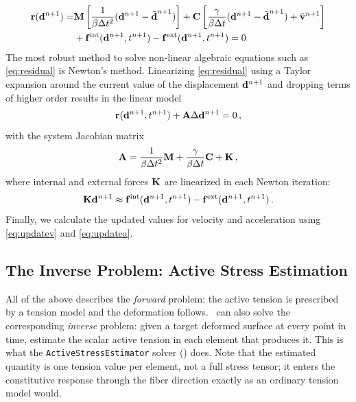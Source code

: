 \begin{align}
     \vec r(\dn{n+1}) =& \M \left[ \frac{1}{\beta \dt^2} (\dn{n+1} - \dnp{n+1}) \right]
        + \C \left[ \frac{\gamma}{\beta \dt} (\dn{n+1} - \dnp{n+1}) + \vnp{n+1} \right] \nonumber \\
        &+ \vec f^\mathrm{int}(\dn{n+1}, \tn{n+1}) - \vec f^\mathrm{ext}(\dn{n+1}, \tn{n+1}) = 0 \label{eq:residual}
\end{align}
The most robust method to solve non-linear algebraic equations such as \autoref{eq:residual} is Newton's method.
Linearizing \autoref{eq:residual} using a Taylor expansion around the current value of the displacement $\dn{n+1}$ and dropping terms of higher order results in the linear model
\begin{equation}
    \vec r(\dn{n+1}, \tn{n+1}) + \vec A \Delta \dn{n+1} = 0 \,, \label{eq:linMech}
\end{equation}
with the system Jacobian matrix
\begin{equation}
    \vec A = \frac{1}{\beta \dt^2} \M + \frac{\gamma}{\beta \dt} \C + \K \,,
\end{equation}
where internal and external forces $\K$ are linearized in each Newton iteration:
\begin{equation}
    \K \dn{n+1} \approx \vec f^\mathrm{int}(\dn{n+1}, \tn{n+1}) - \vec f^\mathrm{ext}(\dn{n+1}, \tn{n+1}) \,.
\end{equation}
Finally, we calculate the updated values for velocity and acceleration using \autoref{eq:updatev} and \autoref{eq:updatea}.


\subsection{The Inverse Problem: Active Stress Estimation}
\label{model:inverseproblem}

All of the above describes the \emph{forward} problem: the active tension is prescribed by a tension model and the deformation follows.
\CM~can also solve the corresponding \emph{inverse} problem: given a target deformed surface at every point in time, estimate the scalar active tension in each element that produces it.
This is what the \verb|ActiveStressEstimator| solver () does.
Note that the estimated quantity is one tension value per element, not a full stress tensor; it enters the constitutive response through the fiber direction exactly as an ordinary tension model would.

